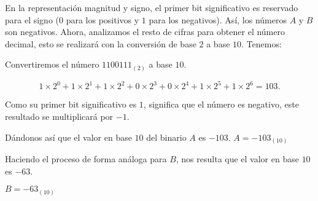 \begin{frame}
\begin{solution}
\begin{enumerate}[a)]
			      En la representación magnitud y signo, el primer bit
			      significativo es reservado para el signo
			      ($0$ para los positivos y $1$ para los negativos).
			      Así, los números $A$ y $B$ son negativos.
			      Ahora, analizamos el resto de cifras para obtener el
			      número decimal, esto se realizará con la conversión de
			      base $2$ a base $10$.
			      Tenemos:

			      Convertiremos el número ${1100111}_{\left(2\right)}$ a
			      base $10$.

			      \begin{equation*}
				      1\times 2^{0}+
				      1\times2^{1}+
				      1\times2^{2}+
				      0\times2^{3}+
				      0\times2^{4}+
				      1\times2^{5}+
				      1\times2^{6}=
				      103.
			      \end{equation*}

			      Como su primer bit significativo es $1$, significa que el
			      número es negativo, este resultado se multiplicará por
			      $-1$.

			      Dándonos así que el valor en base $10$ del binario $A$ es
			      $-103$.
			      $A=-{103}_{\left(10\right)}$

			      Haciendo el proceso de forma análoga para $B$, nos
			      resulta que el valor en base $10$ es $-63$.

			      $B=-{63}_{\left(10\right)}$
		\end{enumerate}
	\end{solution}
\end{frame}

